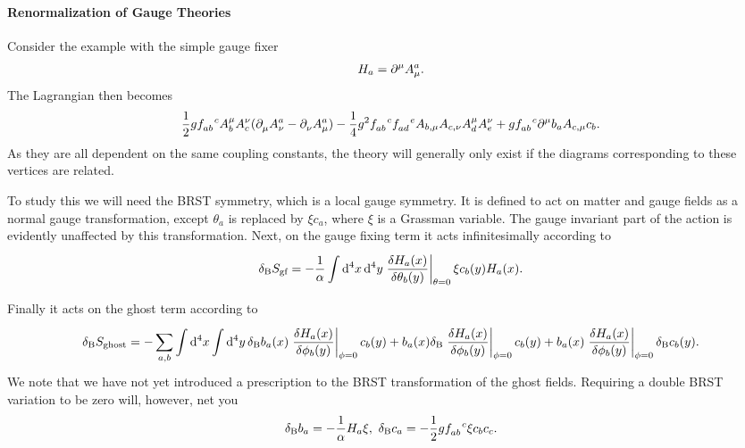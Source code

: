 \paragraph{Renormalization of Gauge Theories}
Consider the example with the simple gauge fixer
\begin{align*}
	H_{a} = \partial^{\mu}_{}A_{\mu}^{a}.
\end{align*}
The Lagrangian then becomes
\begin{align*}
	\frac{1}{2}g\srconst{ab}{c}A^{\mu}_{b}A^{\nu}_{c}(\del{}{\mu}A_{\nu}^{a} - \del{}{\nu}A_{\mu}^{a}) - \frac{1}{4}g^{2}\srconst{ab}{c}\srconst{ad}{e}A_{b, \mu}A_{c, \nu}A^{\mu}_{d}A^{\nu}_{e} + g\srconst{ab}{c}\del{\mu}{}b_{a}A_{c, \mu}c_{b}.
\end{align*}
As they are all dependent on the same coupling constants, the theory will generally only exist if the diagrams corresponding to these vertices are related.

To study this we will need the BRST symmetry, which is a local gauge symmetry. It is defined to act on matter and gauge fields as a normal gauge transformation, except $\theta_{a}$ is replaced by $\xi c_{a}$, where $\xi$ is a Grassman variable. The gauge invariant part of the action is evidently unaffected by this transformation. Next, on the gauge fixing term it acts infinitesimally according to
\begin{align*}
	\delta_{\text{B}}S_{\text{gf}} = -\frac{1}{\alpha}\inte{}{}\dd[4]{x}\dd[4]{y}\eval{\fdv{H_{a}(x)}{\theta_{b}(y)}}_{\theta = 0}\xi c_{b}(y)H_{a}(x).
\end{align*}
Finally it acts on the ghost term according to
\begin{align*}
	\delta_{\text{B}}S_{\text{ghost}} = -\sum\limits_{a, b}\integ[4]{}{}{x}{\integ[4]{}{}{y}{\delta_{\text{B}}b_{a}(x)\eval{\fdv{H_{a}(x)}{\phi_{b}(y)}}_{\phi = 0}c_{b}(y) + b_{a}(x)\delta_{\text{B}}\eval{\fdv{H_{a}(x)}{\phi_{b}(y)}}_{\phi = 0}c_{b}(y) + b_{a}(x)\eval{\fdv{H_{a}(x)}{\phi_{b}(y)}}_{\phi = 0}\delta_{\text{B}}c_{b}(y)}}.
\end{align*}
We note that we have not yet introduced a prescription to the BRST transformation of the ghost fields. Requiring a double BRST variation to be zero will, however, net you
\begin{align*}
	\delta_{\text{B}}b_{a} = -\frac{1}{\alpha}H_{a}\xi,\ \delta_{\text{B}}c_{a} = -\frac{1}{2}g\srconst{ab}{c}\xi c_{b}c_{c}.
\end{align*}